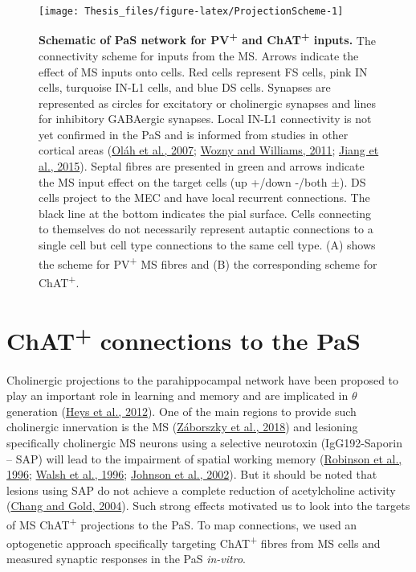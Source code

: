 \documentclass[
  12pt,
  a4paper,
  openany]{book}
\begin{document}
\begin{figure}[htbp]

{\centering \texttt{[image: Thesis\_files/figure-latex/ProjectionScheme-1]} 

}

\caption[Schematic of PaS network for PV\textsuperscript{+} and ChAT\textsuperscript{+} inputs]{\textbf{Schematic of PaS network for PV\textsuperscript{+} and ChAT\textsuperscript{+} inputs.} The connectivity scheme for inputs from the MS. Arrows indicate the effect of MS inputs onto cells. Red cells represent FS cells, pink IN cells, turquoise IN-L1 cells, and blue DS cells. Synapses are represented as circles for excitatory or cholinergic synapses and lines for inhibitory GABAergic synapses. Local IN-L1 connectivity is not yet confirmed in the PaS and is informed from studies in other cortical areas (\protect\hyperlink{ref-olah_output_2007}{Oláh et al., 2007}; \protect\hyperlink{ref-wozny_specificity_2011}{Wozny and Williams, 2011}; \protect\hyperlink{ref-jiang_principles_2015}{Jiang et al., 2015}). Septal fibres are presented in green and arrows indicate the MS input effect on the target cells (up +/down -/both ±). DS cells project to the MEC and have local recurrent connections. The black line at the bottom indicates the pial surface. Cells connecting to themselves do not necessarily represent autaptic connections to a single cell but cell type connections to the same cell type. (A) shows the scheme for PV\textsuperscript{+} MS fibres and (B) the corresponding scheme for ChAT\textsuperscript{+}.}\label{fig:ProjectionScheme}
\end{figure}

\hypertarget{chat-connections-to-the-pas}{%
\section{\texorpdfstring{ChAT\textsuperscript{+} connections to the PaS}{ChAT+ connections to the PaS}}\label{chat-connections-to-the-pas}}

Cholinergic projections to the parahippocampal network have been proposed to play an important role in learning and memory and are implicated in \(\theta\) generation (\protect\hyperlink{ref-heys_effects_2012}{Heys et al., 2012}). One of the main regions to provide such cholinergic innervation is the MS (\protect\hyperlink{ref-zaborszky_specific_2018}{Záborszky et al., 2018}) and lesioning specifically cholinergic MS neurons using a selective neurotoxin (IgG192-Saporin -- SAP) will lead to the impairment of spatial working memory (\protect\hyperlink{ref-robinson_192igg-saporin_1996}{Robinson et al., 1996}; \protect\hyperlink{ref-walsh_injection_1996}{Walsh et al., 1996}; \protect\hyperlink{ref-johnson_selective_2002}{Johnson et al., 2002}). But it should be noted that lesions using SAP do not achieve a complete reduction of acetylcholine activity (\protect\hyperlink{ref-chang_impaired_2004}{Chang and Gold, 2004}). Such strong effects motivated us to look into the targets of MS ChAT\textsuperscript{+} projections to the PaS. To map connections, we used an optogenetic approach specifically targeting ChAT\textsuperscript{+} fibres from MS cells and measured synaptic responses in the PaS \emph{in-vitro}.
\end{document}
